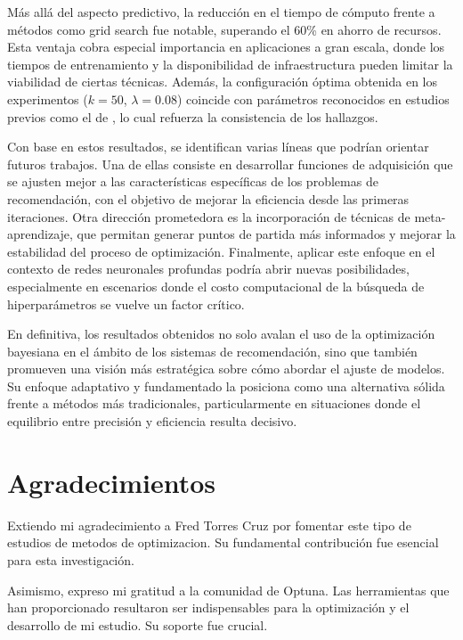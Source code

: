 \documentclass[twocolumn,10pt]{article}
\begin{document}
Más allá del aspecto predictivo, la reducción en el tiempo de cómputo frente a métodos como grid search fue notable, superando el 60\% en ahorro de recursos. Esta ventaja cobra especial importancia en aplicaciones a gran escala, donde los tiempos de entrenamiento y la disponibilidad de infraestructura pueden limitar la viabilidad de ciertas técnicas. Además, la configuración óptima obtenida en los experimentos ($k = 50$, $\lambda = 0.08$) coincide con parámetros reconocidos en estudios previos como el de \citet{koren2009matrix}, lo cual refuerza la consistencia de los hallazgos.

Con base en estos resultados, se identifican varias líneas que podrían orientar futuros trabajos. Una de ellas consiste en desarrollar funciones de adquisición que se ajusten mejor a las características específicas de los problemas de recomendación, con el objetivo de mejorar la eficiencia desde las primeras iteraciones. Otra dirección prometedora es la incorporación de técnicas de meta-aprendizaje, que permitan generar puntos de partida más informados y mejorar la estabilidad del proceso de optimización. Finalmente, aplicar este enfoque en el contexto de redes neuronales profundas podría abrir nuevas posibilidades, especialmente en escenarios donde el costo computacional de la búsqueda de hiperparámetros se vuelve un factor crítico.

En definitiva, los resultados obtenidos no solo avalan el uso de la optimización bayesiana en el ámbito de los sistemas de recomendación, sino que también promueven una visión más estratégica sobre cómo abordar el ajuste de modelos. Su enfoque adaptativo y fundamentado la posiciona como una alternativa sólida frente a métodos más tradicionales, particularmente en situaciones donde el equilibrio entre precisión y eficiencia resulta decisivo.

\section*{Agradecimientos}

Extiendo mi agradecimiento a Fred Torres Cruz por fomentar este tipo de estudios de metodos de optimizacion. Su fundamental contribución fue esencial para esta investigación.

Asimismo, expreso mi gratitud a la comunidad de Optuna. Las herramientas que han proporcionado resultaron ser indispensables para la optimización y el desarrollo de mi estudio. Su soporte fue crucial.


\end{document}
